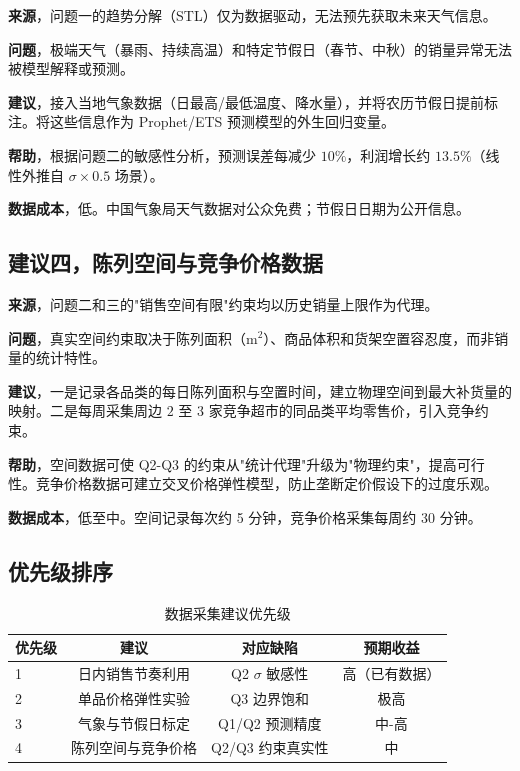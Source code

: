 \textbf{来源}，问题一的趋势分解（STL）仅为数据驱动，无法预先获取未来天气信息。

\textbf{问题}，极端天气（暴雨、持续高温）和特定节假日（春节、中秋）的销量异常无法被模型解释或预测。

\textbf{建议}，接入当地气象数据（日最高/最低温度、降水量），并将农历节假日提前标注。将这些信息作为 Prophet/ETS 预测模型的外生回归变量。

\textbf{帮助}，根据问题二的敏感性分析，预测误差每减少 $10\%$，利润增长约 $13.5\%$（线性外推自 $\sigma \times 0.5$ 场景）。

\textbf{数据成本}，低。中国气象局天气数据对公众免费；节假日日期为公开信息。

\subsection{建议四，陈列空间与竞争价格数据}

\textbf{来源}，问题二和三的"销售空间有限"约束均以历史销量上限作为代理。

\textbf{问题}，真实空间约束取决于陈列面积（$\text{m}^2$）、商品体积和货架空置容忍度，而非销量的统计特性。

\textbf{建议}，一是记录各品类的每日陈列面积与空置时间，建立物理空间到最大补货量的映射。二是每周采集周边 $2$ 至 $3$ 家竞争超市的同品类平均零售价，引入竞争约束。

\textbf{帮助}，空间数据可使 Q2-Q3 的约束从"统计代理"升级为"物理约束"，提高可行性。竞争价格数据可建立交叉价格弹性模型，防止垄断定价假设下的过度乐观。

\textbf{数据成本}，低至中。空间记录每次约 5 分钟，竞争价格采集每周约 30 分钟。

\subsection{优先级排序}

\begin{table}[H]
\centering
\caption{数据采集建议优先级}
\label{tab:q4_priority}
\begin{tabular}{lccc}
\hline
优先级 & 建议 & 对应缺陷 & 预期收益 \\
\hline
1 & 日内销售节奏利用 & Q2 $\sigma$ 敏感性 & 高（已有数据） \\
2 & 单品价格弹性实验 & Q3 边界饱和 & 极高 \\
3 & 气象与节假日标定 & Q1/Q2 预测精度 & 中-高 \\
4 & 陈列空间与竞争价格 & Q2/Q3 约束真实性 & 中 \\
\hline
\end{tabular}
\end{table}

